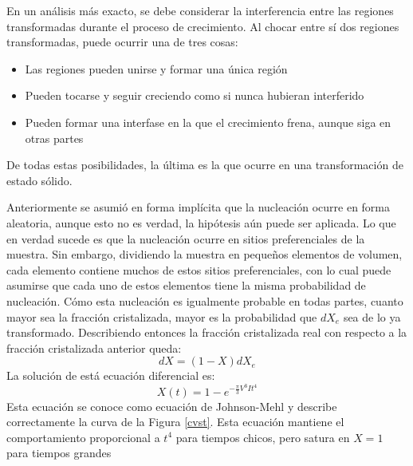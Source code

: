 \documentclass[12pt]{article}
\theoremstyle{definition}
\theoremstyle{remark}
\begin{document}
En un análisis más exacto, se debe considerar la interferencia entre las regiones transformadas durante el proceso de crecimiento. Al chocar entre sí dos regiones transformadas, puede ocurrir una de tres cosas:
\begin{itemize}
\item Las regiones pueden unirse y formar una única región
\item Pueden tocarse y seguir creciendo como si nunca hubieran interferido
\item Pueden formar una interfase en la que el crecimiento frena, aunque siga en otras partes
\end{itemize}

De todas estas posibilidades, la última es la que ocurre en una transformación de estado sólido.

Anteriormente se asumió en forma implícita que la nucleación ocurre en forma aleatoria, aunque esto no es verdad, la hipótesis aún puede ser aplicada. Lo que en verdad sucede es que la nucleación ocurre en sitios preferenciales de la muestra. Sin embargo, dividiendo la muestra en pequeños elementos de volumen, cada elemento contiene muchos de estos sitios preferenciales, con lo cual puede asumirse que cada uno de estos elementos tiene la misma probabilidad de nucleación. Cómo esta nucleación es igualmente probable en todas partes, cuanto mayor sea la fracción cristalizada, mayor es la probabilidad que $dX_e$ sea de lo ya transformado. Describiendo entonces la fracción cristalizada real con respecto a la fracción cristalizada anterior queda:
\begin{equation}
 dX = (1 - X)dX_e
\end{equation}
La solución de está ecuación diferencial es:
\begin{equation}
	X(t)=1-e^{-\frac{\pi}{3}V^3 I t^4}
\end{equation}
Esta ecuación se conoce como ecuación de Johnson-Mehl y describe correctamente la curva de la Figura \ref{cvst}. Esta ecuación mantiene el comportamiento proporcional a $t^4$ para tiempos chicos, pero satura en $X = 1$ para tiempos grandes
\end{document}
